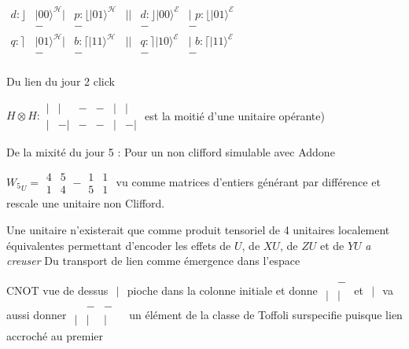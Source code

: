 \documentclass{article}
\newcommand{\ket}[1]{\ensuremath{|{#1}\rangle}}
\begin{document}
$
\begin{matrix}
d:\rfloor &\ket{00}^{\mathcal H} |&p:\lfloor \ket{01}^{\mathcal H}&||&d:\rfloor \ket{00}^{\mathcal E}&| \,\,p: \lfloor \ket{01}^{\mathcal E}\\
&-&-&&-&-\\
q:\rceil &\ket{01}^{\mathcal H} |&b:\lceil \ket{11}^{\mathcal H}&||&q:\rceil \ket{10}^{\mathcal E}&| \, \, b:\lceil \ket{11}^{\mathcal E}\\
&-&-&&-&-\\
\end{matrix}
$

Du lien du jour 2 click

$H\otimes H :  \begin{matrix}
  | &|  &-&-&|&| \\
  |&-|&-&-&|&-|
\end{matrix}$ est la moitié d'une  unitaire opérante)


De la mixité du jour 5 : Pour un non clifford simulable avec Addone


${W_5}_U=
\begin{matrix}
4 &5 \\
1&4
\end{matrix}
-
 \begin{matrix}
1 &1 \\
5&1
\end{matrix}
$ vu comme matrices d'entiers générant par différence et rescale une unitaire non Clifford.

Une unitaire n'existerait que comme produit tensoriel de 4 unitaires localement équivalentes permettant d'encoder les effets de $U$, de $XU$, de $ZU$ et de $YU$ %
\emph{a creuser}
Du transport de lien comme émergence dans l'espace 

CNOT vue de dessus $ \begin{matrix}
  |  \end{matrix}$  pioche dans la colonne initiale et donne $ \begin{matrix}
& -\\
  | & |
   \end{matrix}$ et  $ \begin{matrix}
  |  \end{matrix} $ va aussi donner  $ \begin{matrix}
 &-&-&\\
  | & |&|
   \end{matrix}$ un élément de la classe de Toffoli  surspecifie puisque lien accroché au premier
 
\end{document}
